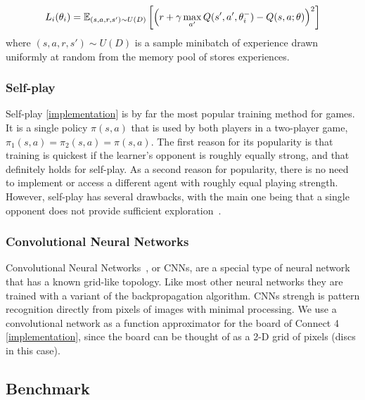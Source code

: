 \documentclass{article}
\newcommand{\GithubURL}[1]{[\href{https://github.com/davidrobles/mlnd-capstone-code/blob/master/#1}{implementation}]}
\begin{document}
\begin{equation}
L_i(\theta_i) = \mathbb{E}_{(s, a, r, s') \sim U(D)} \\
                \left[\left(r + \gamma \max_{a'} Q(s',a', \theta^-_i) - Q(s,a;\theta)\right)^2\right]
\end{equation}
where $(s, a, r, s') \sim U(D)$ is a sample minibatch of experience drawn uniformly at random from
the memory pool of stores experiences.

\subsubsection{Self-play}

Self-play \GithubURL{capstone/rl/learners/qlearning_approx.py\#L24} is by far the most popular
training method for games. It is a single policy $\pi(s,a)$ that is used by both players in a
two-player game, $\pi_1(s,a) = \pi_2(s,a) = \pi(s,a)$. The first reason for its popularity is that
training is quickest if the learner's opponent is roughly equally strong, and that definitely holds
for self-play. As a second reason for popularity, there is no need to implement or access a
different agent with roughly equal playing strength. However, self-play has several drawbacks, with
the main one being that a single opponent does not provide sufficient
exploration~\citep{Szita2011RLGames}.

\subsubsection{Convolutional Neural Networks}

Convolutional Neural Networks~\citep{LeCun1989}, or CNNs, are a special type of neural network that
has a known grid-like topology. Like most other neural networks they are trained with a variant of
the backpropagation algorithm. CNNs strengh is pattern recognition directly from pixels of images
with minimal processing. We use a convolutional network as a function approximator for the board of
Connect 4 \GithubURL{capstone/rl/value_functions/c4deepnetwork.py\#L42}, since the board can be
thought of as a 2-D grid of pixels (discs in this case).

\subsection{Benchmark}
\label{sec:benchmark}
\end{document}
